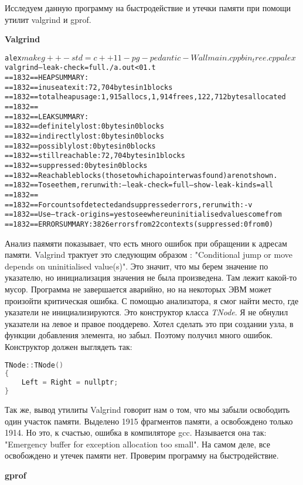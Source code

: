 Исследуем данную программу на быстродействие и утечки памяти при помощи утилит valgrind и gprof.

\textbf{Valgrind}

\begin{alltt}
alex$make
g++ -std=c++11 -pg -pedantic -Wall main.cpp bin_tree.cpp
alex$valgrind --leak-check=full ./a.out < 01.t
==1832== HEAP SUMMARY:
==1832==     in use at exit: 72,704 bytes in 1 blocks
==1832==   total heap usage: 1,915 allocs, 1,914 frees, 122,712 bytes allocated
==1832==
==1832== LEAK SUMMARY:
==1832==    definitely lost: 0 bytes in 0 blocks
==1832==    indirectly lost: 0 bytes in 0 blocks
==1832==      possibly lost: 0 bytes in 0 blocks
==1832==    still reachable: 72,704 bytes in 1 blocks
==1832==         suppressed: 0 bytes in 0 blocks
==1832== Reachable blocks (those to which a pointer was found) are not shown.
==1832== To see them, rerun with: --leak-check=full --show-leak-kinds=all
==1832==
==1832== For counts of detected and suppressed errors, rerun with: -v
==1832== Use --track-origins=yes to see where uninitialised values come from
==1832== ERROR SUMMARY: 3826 errors from 22 contexts (suppressed: 0 from 0)
\end{alltt}
Анализ паямяти показывает, что есть много ошибок при обращении к адресам памяти.
Valgrind трактует это следующим образом : "Conditional jump or move depends on uninitialised value(s)". Это значит, что мы берем значение по указателю, но инициализация значения не была произведена. Там лежит какой-то мусор. Программа не завершается аварийно, но на некоторых ЭВМ может произойти критическая ошибка. С помощью анализатора, я смог найти место, где указатели не инициализируются. Это конструктор класса \textit{TNode}. Я не обнулил указатели на левое и правое пооддерево. Хотел сделать это при создании узла, в функции добавления элемента, но забыл. Поэтому получил много ошибок.
Конструктор должен выглядеть так:
\begin{lstlisting}[language=C]
TNode::TNode()
{
    Left = Right = nullptr;
}
\end{lstlisting}
Так же, вывод утилиты Valgrind говорит нам о том, что мы забыли освободить один участок памяти. Выделено 1915 фрагментов памяти, а освобождено только 1914. Но это, к счастью, ошибка в компиляторе gcc. Называется она так: "Emergency buffer for exception allocation too small". На самом деле, все освобождено и утечек памяти нет.
Проверим программу на быстродействие.

\textbf{gprof}

